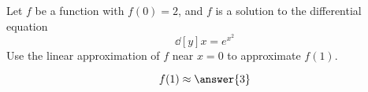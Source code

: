 \documentclass{ximera}
\author{Steven Gubkin}
\begin{document}
\begin{exercise}



Let $f$ be a function with $f(0) = 2$, and $f$ is a solution to the differential equation 
\[
\dd[y]{x} = e^{x^2}
\]
Use the linear approximation of $f$ near $x=0$ to approximate $f(1)$. 
\begin{prompt}
	\[
	f(1) \approx \answer{3}
	\]
\end{prompt}

\end{exercise}
\end{document}
